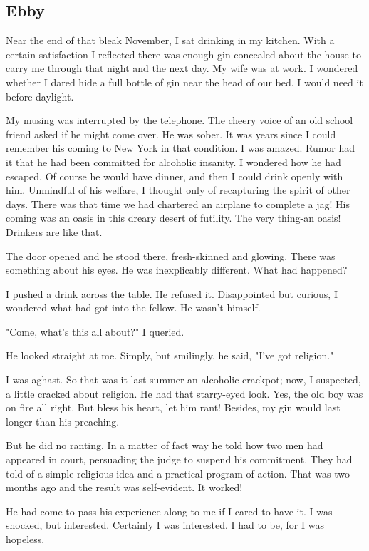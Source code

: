 \subsection{Ebby}

Near the end of that bleak November, I sat drinking in my kitchen.
With a certain satisfaction I reflected there was enough gin concealed about the house to carry me through that night and the next day.
My wife was at work.
I wondered whether I dared hide a full bottle of gin near the head of our bed.
I would need it before daylight.

My musing was interrupted by the telephone.
The cheery voice of an old school friend asked if he might come over.
He was sober.
It was years since I could remember his coming to New York in that condition.
I was amazed.
Rumor had it that he had been committed for alcoholic insanity.
I wondered how he had escaped.
Of course he would have dinner, and then I could drink openly with him.
Unmindful of his welfare, I thought only of recapturing the spirit of other days.
There was that time we had chartered an airplane to complete a jag!
His coming was an oasis in this dreary desert of futility.
The very thing-an oasis!
Drinkers are like that.

The door opened and he stood there, fresh-skinned and glowing.
There was something about his eyes.
He was inexplicably different.
What had happened?

I pushed a drink across the table.
He refused it.
Disappointed but curious, I wondered what had got into the fellow.
He wasn't himself.

"Come, what's this all about?" I queried.

He looked straight at me.
Simply, but smilingly, he said, "I've got religion."

I was aghast.
So that was it-last summer an alcoholic crackpot; now, I suspected, a little cracked about religion.
He had that starry-eyed look.
Yes, the old boy was on fire all right.
But bless his heart, let him rant!
Besides, my gin would last longer than his preaching.

But he did no ranting.
In a matter of fact way he told how two men had appeared in court, persuading the judge to suspend his commitment.
They had told of a simple religious idea and a practical program of action.
That was two months ago and the result was self-evident.
It worked!

He had come to pass his experience along to me-if I cared to have it.
I was shocked, but interested.
Certainly I was interested.
I had to be, for I was hopeless.

